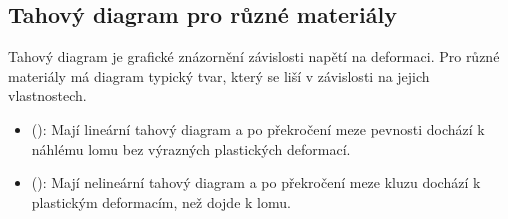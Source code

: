 \documentclass[letterpaper,10pt,english]{jupyterBook}
\begin{document}
\subsection{Tahový diagram pro různé materiály}
\label{\detokenize{Prednasky/2_3_Tahov_xe1_zkou_u0161ka:tahovy-diagram-pro-ruzne-materialy}}
\sphinxAtStartPar
Tahový diagram je grafické znázornění závislosti napětí na deformaci. Pro různé materiály má diagram typický tvar, který se liší v závislosti na jejich vlastnostech.
\begin{itemize}
\item {} 
\sphinxAtStartPar
{} (): Mají lineární tahový diagram a po překročení meze pevnosti dochází k náhlému lomu bez výrazných plastických deformací.

\item {} 
\sphinxAtStartPar
{} (): Mají nelineární tahový diagram a po překročení meze kluzu dochází k plastickým deformacím, než dojde k lomu.

\end{itemize}
\end{document}
